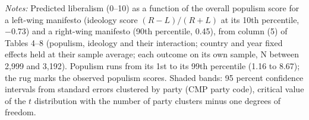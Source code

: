 \par\smallskip\begin{minipage}{\linewidth}\scriptsize\textit{Notes:} Predicted liberalism (0--10) as a function of the overall populism score for a left-wing manifesto (ideology score $(R-L)/(R+L)$ at its 10th percentile, $-$0.73) and a right-wing manifesto (90th percentile, 0.45), from column (5) of Tables 4--8 (populism, ideology and their interaction; country and year fixed effects held at their sample average; each outcome on its own sample, N between 2,999 and 3,192). Populism runs from its 1st to its 99th percentile (1.16 to 8.67); the rug marks the observed populism scores. Shaded bands: 95 percent confidence intervals from standard errors clustered by party (CMP party code), critical value of the $t$ distribution with the number of party clusters minus one degrees of freedom.\end{minipage}
